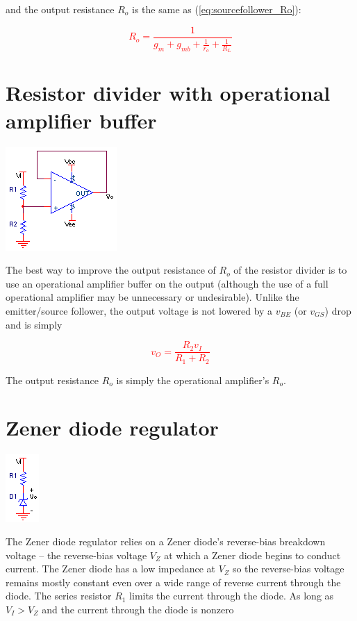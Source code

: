 \noindent and the output resistance $R_{o}$ is the same as (\ref{eq:sourcefollower_Ro}):

\textcolor{red}{
\begin{equation}
R_{o} = \frac{1}{g_{m}+g_{mb}+\frac{1}{r_{o}}+\frac{1}{R_{L}}}
\end{equation}
}

\section{Resistor divider with operational amplifier buffer}
\begin{center}
	\includegraphics{schematics/resistordivider_opampbuffer.PNG}
\end{center}
The best way to improve the output resistance of $R_{o}$ of the resistor divider is to use an operational amplifier buffer on the output (although the use of a full operational amplifier may be unnecessary or undesirable). Unlike the emitter/source follower, the output voltage is not lowered by a $v_{BE}$ (or $v_{GS}$) drop and is simply

\textcolor{red}{
\begin{equation}
v_{O} = \frac{R_{2}v_{I}}{R_{1}+R_{2}}
\end{equation}
}

\noindent The output resistance $R_{o}$ is simply the operational amplifier's $R_{o}$.

\section{Zener diode regulator}
\begin{center}
	\includegraphics{schematics/zenerdiode_regulator.PNG}
\end{center}

The Zener diode regulator relies on a Zener diode's reverse-bias breakdown voltage -- the reverse-bias voltage $V_{Z}$ at which a Zener diode begins to conduct current. The Zener diode has a low impedance at $V_{Z}$ so the reverse-bias voltage remains mostly constant even over a wide range of reverse current through the diode. The series resistor $R_{1}$ limits the current through the diode. As long as $V_{I} > V_{Z}$ and the current through the diode is nonzero

